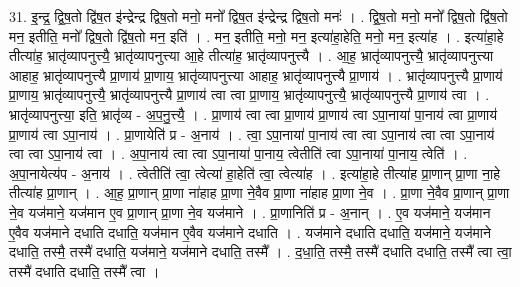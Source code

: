 \documentclass[17pt]{extarticle}
\begin{document}
31. इ॒न्द्र॒ द्वि॒ष॒तो द्वि॑ष॒त इ॑न्द्रेन्द्र द्विष॒तो मनो॒ मनो᳚ द्विष॒त इ॑न्द्रेन्द्र द्विष॒तो मनः॑ । . द्वि॒ष॒तो मनो॒ मनो᳚ द्विष॒तो द्वि॑ष॒तो मन॒ इतीति॒ मनो᳚ द्विष॒तो द्वि॑ष॒तो मन॒ इति॑ । . मन॒ इतीति॒ मनो॒ मन॒ इत्या॑हा॒हेति॒ मनो॒ मन॒ इत्या॑ह । . इत्या॑हा॒हे तीत्या॑ह॒ भ्रातृ॑व्यापनुत्त्यै॒ भ्रातृ॑व्यापनुत्त्या आ॒हे तीत्या॑ह॒ भ्रातृ॑व्यापनुत्त्यै । . आ॒ह॒ भ्रातृ॑व्यापनुत्त्यै॒ भ्रातृ॑व्यापनुत्त्या आहाह॒ भ्रातृ॑व्यापनुत्त्यै प्रा॒णाय॑ प्रा॒णाय॒ भ्रातृ॑व्यापनुत्त्या आहाह॒ भ्रातृ॑व्यापनुत्त्यै प्रा॒णाय॑ । . भ्रातृ॑व्यापनुत्त्यै प्रा॒णाय॑ प्रा॒णाय॒ भ्रातृ॑व्यापनुत्त्यै॒ भ्रातृ॑व्यापनुत्त्यै प्रा॒णाय॑ त्वा त्वा प्रा॒णाय॒ भ्रातृ॑व्यापनुत्त्यै॒ भ्रातृ॑व्यापनुत्त्यै प्रा॒णाय॑ त्वा । . भ्रातृ॑व्यापनुत्त्या॒ इति॒ भ्रातृ॑व्य - अ॒प॒नु॒त्त्यै॒ । . प्रा॒णाय॑ त्वा त्वा प्रा॒णाय॑ प्रा॒णाय॑ त्वा ऽपा॒नाया॑ पा॒नाय॑ त्वा प्रा॒णाय॑ प्रा॒णाय॑ त्वा ऽपा॒नाय॑ । . प्रा॒णायेति॑ प्र - अ॒नाय॑ । . त्वा॒ ऽपा॒नाया॑ पा॒नाय॑ त्वा त्वा ऽपा॒नाय॑ त्वा त्वा ऽपा॒नाय॑ त्वा त्वा ऽपा॒नाय॑ त्वा । . अ॒पा॒नाय॑ त्वा त्वा ऽपा॒नाया॑ पा॒नाय॒ त्वेतीति॑ त्वा ऽपा॒नाया॑ पा॒नाय॒ त्वेति॑ । . अ॒पा॒नायेत्य॑प - अ॒नाय॑ । . त्वेतीति॑ त्वा॒ त्वेत्या॑ हा॒हेति॑ त्वा॒ त्वेत्या॑ह । . इत्या॑हा॒हे तीत्या॑ह प्रा॒णान् प्रा॒णा ना॒हे तीत्या॑ह प्रा॒णान् । . आ॒ह॒ प्रा॒णान् प्रा॒णा ना॑हाह प्रा॒णा ने॒वैव प्रा॒णा ना॑हाह प्रा॒णा ने॒व । . प्रा॒णा ने॒वैव प्रा॒णान् प्रा॒णा ने॒व यज॑माने॒ यज॑मान ए॒व प्रा॒णान् प्रा॒णा ने॒व यज॑माने । . प्रा॒णानिति॑ प्र - अ॒नान् । . ए॒व यज॑माने॒ यज॑मान ए॒वैव यज॑माने दधाति दधाति॒ यज॑मान ए॒वैव यज॑माने दधाति । . यज॑माने दधाति दधाति॒ यज॑माने॒ यज॑माने दधाति॒ तस्मै॒ तस्मै॑ दधाति॒ यज॑माने॒ यज॑माने दधाति॒ तस्मै᳚ । . द॒धा॒ति॒ तस्मै॒ तस्मै॑ दधाति दधाति॒ तस्मै᳚ त्वा त्वा॒ तस्मै॑ दधाति दधाति॒ तस्मै᳚ त्वा । \newline
\end{document}
